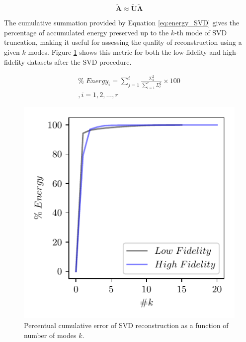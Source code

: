 \documentclass[10pt,oneside,a4paper,twocolumn]{article}
\begin{document}
\begin{equation}
\tilde{\mathbf{A}} \approx  \tilde{\mathbf{U}} \tilde{\mathbf{\Lambda}}
\end{equation}
 
The cumulative summation provided by Equation \eqref{eq:energy_SVD} gives the percentage of accumulated energy preserved up to the $k$-th mode of SVD truncation, making it useful for assessing the quality of reconstruction using a given $k$ modes. Figure \ref{fig:svd_energy} shows this metric for both the low-fidelity and high-fidelity datasets after the SVD procedure.

\begin{equation}
\begin{split}
\%\; Energy_i= \sum_{j=1}^i \frac{\Sigma_k^2}{\sum_{l=1}^r \Sigma_l^2} \times 100 \\ , i = 1,2, \dots, r
\end{split}
\label{eq:energy_SVD}
\end{equation}

\begin{figure}[htbp]
  \centering
  \includegraphics[width=\columnwidth]{figures/svd_energy.pdf}
  \caption{Percentual cumulative error of SVD reconstruction as a function of number of modes $k$.}
  \label{fig:svd_energy}
\end{figure}
\end{document}
